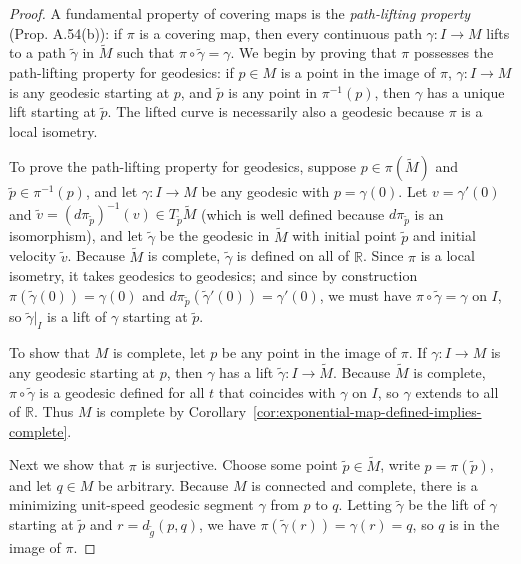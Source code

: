 \begin{proof}
A fundamental property of covering maps is the \emph{path-lifting property} (Prop. A.54(b)): if $\pi$ is a covering map, then every continuous path $\gamma: I \to M$ lifts to a path $\tilde{\gamma}$ in $\tilde{M}$ such that $\pi \circ \tilde{\gamma} = \gamma$. We begin by proving that $\pi$ possesses the path-lifting property for geodesics: if $p \in M$ is a point in the image of $\pi$, $\gamma: I \to M$ is any geodesic starting at $p$, and $\tilde{p}$ is any point in $\pi^{-1}(p)$, then $\gamma$ has a unique lift starting at $\tilde{p}$. The lifted curve is necessarily also a geodesic because $\pi$ is a local isometry.

To prove the path-lifting property for geodesics, suppose $p \in \pi(\tilde{M})$ and $\tilde{p} \in \pi^{-1}(p)$, and let $\gamma: I \to M$ be any geodesic with $p = \gamma(0)$. Let $v = \gamma'(0)$ and $\tilde{v} = (d\pi_{\tilde{p}})^{-1}(v) \in T_{\tilde{p}}\tilde{M}$ (which is well defined because $d\pi_{\tilde{p}}$ is an isomorphism), and let $\tilde{\gamma}$ be the geodesic in $\tilde{M}$ with initial point $\tilde{p}$ and initial velocity $\tilde{v}$. Because $\tilde{M}$ is complete, $\tilde{\gamma}$ is defined on all of $\mathbb{R}$. Since $\pi$ is a local isometry, it takes geodesics to geodesics; and since by construction $\pi(\tilde{\gamma}(0)) = \gamma(0)$ and $d\pi_{\tilde{p}}(\tilde{\gamma}'(0)) = \gamma'(0)$, we must have $\pi \circ \tilde{\gamma} = \gamma$ on $I$, so $\tilde{\gamma}|_I$ is a lift of $\gamma$ starting at $\tilde{p}$.

To show that $M$ is complete, let $p$ be any point in the image of $\pi$. If $\gamma : I \to M$ is any geodesic starting at $p$, then $\gamma$ has a lift $\tilde{\gamma} : I \to \tilde{M}$. Because $\tilde{M}$ is complete, $\pi \circ \tilde{\gamma}$ is a geodesic defined for all $t$ that coincides with $\gamma$ on $I$, so $\gamma$ extends to all of $\mathbb{R}$. Thus $M$ is complete by Corollary~\ref{cor:exponential-map-defined-implies-complete}.

Next we show that $\pi$ is surjective. Choose some point $\tilde{p} \in \tilde{M}$, write $p = \pi(\tilde{p})$, and let $q \in M$ be arbitrary. Because $M$ is connected and complete, there is a minimizing unit-speed geodesic segment $\gamma$ from $p$ to $q$. Letting $\tilde{\gamma}$ be the lift of $\gamma$ starting at $\tilde{p}$ and $r = d_{\tilde{g}}(p, q)$, we have $\pi(\tilde{\gamma}(r)) = \gamma(r) = q$, so $q$ is in the image of $\pi$.


\end{proof}
